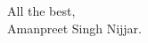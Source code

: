 \documentclass[10pt,a4paper,ragged2e,withhyper]{altacv}
\newcommand{\company}{Sanctuary AI}
\begin{document}



All the best, \linebreak \linebreak \\

Amanpreet Singh Nijjar.
\end{document}
